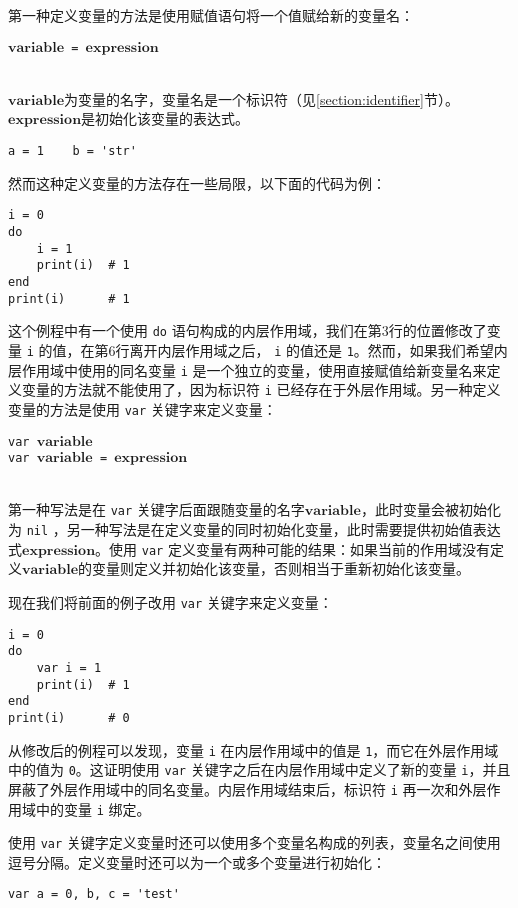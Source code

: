 第一种定义变量的方法是使用赋值语句将一个值赋给新的变量名：
\begin{algorithm}
$\bm{variable}$\texttt{ = }$\bm{expression}$
\end{algorithm}\vspace{-0.6em}\\
$\bm{variable}$为变量的名字，变量名是一个标识符（见\ref{section:identifier}节）。$\bm{expression}$是初始化该变量的表达式。
\begin{lstlisting}[language=berry, numbers=none]
a = 1    b = 'str'
\end{lstlisting}
然而这种定义变量的方法存在一些局限，以下面的代码为例：
\begin{lstlisting}[language=berry]
i = 0
do
    i = 1
    print(i)  # 1
end
print(i)      # 1
\end{lstlisting}
这个例程中有一个使用 \texttt{do} 语句构成的内层作用域，我们在第3行的位置修改了变量 \texttt{i} 的值，在第6行离开内层作用域之后， \texttt{i} 的值还是 \texttt{1}。然而，如果我们希望内层作用域中使用的同名变量 \texttt{i} 是一个独立的变量，使用直接赋值给新变量名来定义变量的方法就不能使用了，因为标识符 \texttt{i} 已经存在于外层作用域。另一种定义变量的方法是使用 \texttt{var} 关键字来定义变量：
\begin{algorithm}
\texttt{var }$\bm{variable}$ \\
\texttt{var }$\bm{variable}$\texttt{ = }$\bm{expression}$
\end{algorithm}\vspace{-0.6em}\\
第一种写法是在 \texttt{var} 关键字后面跟随变量的名字$\bm{variable}$，此时变量会被初始化为 \texttt{nil} ，另一种写法是在定义变量的同时初始化变量，此时需要提供初始值表达式$\bm{expression}$。使用 \texttt{var} 定义变量有两种可能的结果：如果当前的作用域没有定义$\bm{variable}$的变量则定义并初始化该变量，否则相当于重新初始化该变量。

现在我们将前面的例子改用 \texttt{var} 关键字来定义变量：
\begin{lstlisting}[language=berry]
i = 0
do
    var i = 1
    print(i)  # 1
end
print(i)      # 0
\end{lstlisting}
从修改后的例程可以发现，变量 \texttt{i} 在内层作用域中的值是 \texttt{1}，而它在外层作用域中的值为 \texttt{0}。这证明使用 \texttt{var} 关键字之后在内层作用域中定义了新的变量 \texttt{i}，并且屏蔽了外层作用域中的同名变量。内层作用域结束后，标识符 \texttt{i} 再一次和外层作用域中的变量 \texttt{i} 绑定。

使用 \texttt{var} 关键字定义变量时还可以使用多个变量名构成的列表，变量名之间使用逗号分隔。定义变量时还可以为一个或多个变量进行初始化：
\begin{lstlisting}[language=berry, numbers=none]
var a = 0, b, c = 'test'
\end{lstlisting}

